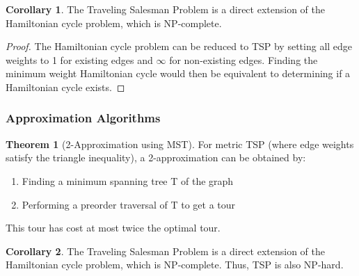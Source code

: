 \documentclass{article}
\theoremstyle{definition}
\newtheorem{theorem}{Theorem}
\newtheorem{corollary}{Corollary}
\begin{document}
\begin{corollary}
The Traveling Salesman Problem is a direct extension of the Hamiltonian cycle problem, which is NP-complete.
\end{corollary}

\begin{proof}
The Hamiltonian cycle problem can be reduced to TSP by setting all edge weights to 1 for existing edges and $\infty$ for non-existing edges. Finding the minimum weight Hamiltonian cycle would then be equivalent to determining if a Hamiltonian cycle exists.
\end{proof}


\subsubsection{Approximation Algorithms}
\begin{theorem}[2-Approximation using MST]
For metric TSP (where edge weights satisfy the triangle inequality), a 2-approximation can be obtained by:
\begin{enumerate}
    \item Finding a minimum spanning tree T of the graph
    \item Performing a preorder traversal of T to get a tour
\end{enumerate}
This tour has cost at most twice the optimal tour.
\end{theorem}

\begin{corollary}
The Traveling Salesman Problem is a direct extension of the Hamiltonian cycle problem, which is NP-complete. Thus, TSP is also NP-hard.
\end{corollary}
\end{document}
